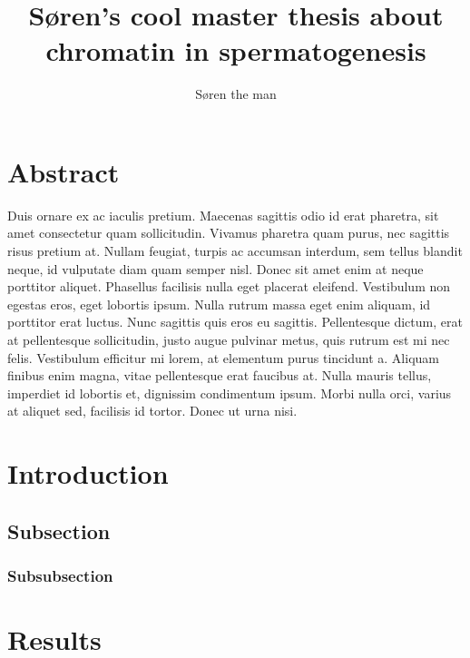 \documentclass[
  a4paper,
]{scrbook}
\title{Søren's cool master thesis about chromatin in spermatogenesis}
\author{Søren the man}
\date{}
\renewcommand*\contentsname{Table of contents}
\newcommand\contentsname{Table of contents}
\begin{document}
\frontmatter
\maketitle

\renewcommand*\contentsname{Table of contents}
{
\setcounter{tocdepth}{1}
\tableofcontents
}

\mainmatter
\chapter{Abstract}\label{abstract}

Duis ornare ex ac iaculis pretium. Maecenas sagittis odio id erat
pharetra, sit amet consectetur quam sollicitudin. Vivamus pharetra quam
purus, nec sagittis risus pretium at. Nullam feugiat, turpis ac accumsan
interdum, sem tellus blandit neque, id vulputate diam quam semper nisl.
Donec sit amet enim at neque porttitor aliquet. Phasellus facilisis
nulla eget placerat eleifend. Vestibulum non egestas eros, eget lobortis
ipsum. Nulla rutrum massa eget enim aliquam, id porttitor erat luctus.
Nunc sagittis quis eros eu sagittis. Pellentesque dictum, erat at
pellentesque sollicitudin, justo augue pulvinar metus, quis rutrum est
mi nec felis. Vestibulum efficitur mi lorem, at elementum purus
tincidunt a. Aliquam finibus enim magna, vitae pellentesque erat
faucibus at. Nulla mauris tellus, imperdiet id lobortis et, dignissim
condimentum ipsum. Morbi nulla orci, varius at aliquet sed, facilisis id
tortor. Donec ut urna nisi.

\chapter{Introduction}\label{introduction}

\section{Subsection}\label{subsection}

\subsection{Subsubsection}\label{subsubsection}

\chapter{Results}\label{results}
\end{document}
